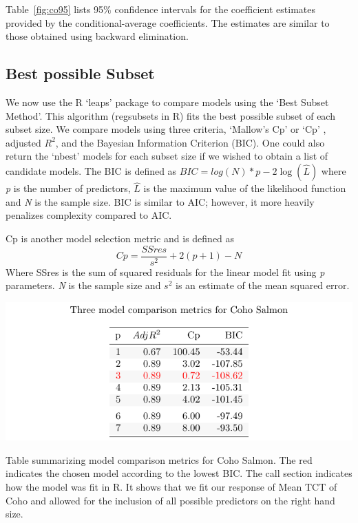 Table~\ref{fig:co95} lists 95\% confidence intervals for the coefficient estimates provided by the conditional-average coefficients. The estimates are similar to those obtained using backward elimination.





\newpage

\subsection{Best possible Subset}

We now use the R  `leaps' package \citep{leaps} to compare models using the `Best Subset Method'. This algorithm (regsubsets in R) fits the best possible subset of each subset size. We compare models using three criteria,  `Mallow's Cp' or `Cp' \citep{MallowCP}, adjusted $R^{2}$, and the Bayesian Information Criterion (BIC).  One could also return the `nbest' models for each subset size if we wished to obtain a list of candidate models.  The BIC is defined as $BIC=log(N)*p-2\log(\hat L)$ \citep{BIC} where \textit{p} is the number of predictors, $\hat{L}$ is the maximum value of the likelihood function and \textit{N} is the sample size. BIC is similar to AIC; however, it more heavily penalizes complexity compared to AIC.

\vspace{5mm}

Cp is another model selection metric and is defined as $$Cp=\frac{SSres}{s^{2}}+2(p+1)-N$$ Where SSres is the sum of squared residuals for the linear model fit using \textit{p} parameters. \textit{N} is the sample size and $s^{2}$ is an estimate of the mean squared error.

\vspace{5mm}

 \begin{singlespace*}
\fontsize{11pt}{12pt}\selectfont

\end{singlespace*}


\begin{table}[H]
\includegraphics{Chapter5Images/subsets_kable.pdf}
\caption{ \hspace{1mm} Table summarizing model comparison metrics for Coho Salmon. The red indicates the chosen model according to the lowest BIC. The call section indicates how the model was fit in R. It shows that we fit our response of Mean TCT of Coho and allowed for the inclusion of all possible predictors on the right hand size.}
\label{fig:cohocompare}
\end{table}


